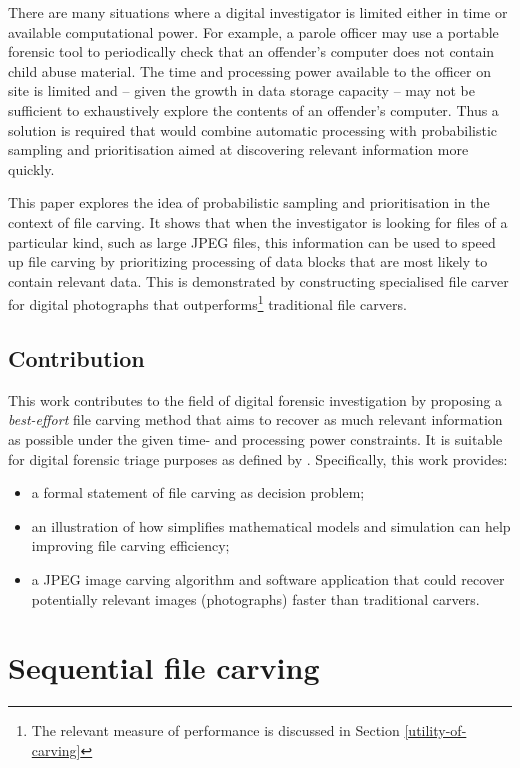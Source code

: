 \documentclass[final,5p,times,twocolumn,authoryear]{elsarticle}
\begin{document}
There are many situations where a digital investigator is limited either in time or available computational power. For example, a parole officer may use a portable forensic tool to periodically check that an offender's computer does not contain child abuse material. The time and processing power available to the officer on site is limited and -- given the growth in data storage capacity -- may not be sufficient to exhaustively explore the contents of an offender's computer. Thus a solution is required that would combine automatic processing with probabilistic sampling and prioritisation aimed at discovering relevant information more quickly.

This paper explores the idea of probabilistic sampling and prioritisation in the context of file carving. It shows that when the investigator is looking for files of a particular kind, such as large JPEG files, this information can be used to speed up file carving by prioritizing processing of data blocks that are most likely to contain relevant data. This is demonstrated by constructing specialised file carver for digital photographs that outperforms\footnote{The relevant measure of performance is discussed in Section \ref{utility-of-carving}} traditional file carvers.

\subsection{Contribution}
This work contributes to the field of digital forensic investigation by proposing a \emph{best-effort} file carving method that aims to recover as much relevant information as possible under the given time- and processing power constraints. It is suitable for digital forensic triage purposes as defined by \cite{Koopmans2013}. Specifically, this work provides:
\begin{itemize}
	\item{a formal statement of file carving as decision problem;}
	\item{an illustration of how simplifies mathematical models and simulation can help improving file carving efficiency;}
	\item{a JPEG image carving algorithm and software application that could recover potentially relevant images (photographs) faster than traditional carvers.}
\end{itemize}

\section{Sequential file carving}
\end{document}
